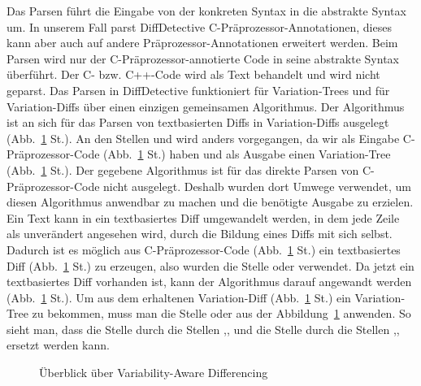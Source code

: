 Das Parsen führt die Eingabe von der konkreten Syntax in die abstrakte Syntax um. In unserem Fall parst DiffDetective  C-Präprozessor-Annotationen, dieses kann aber auch auf andere Präprozessor-Annotationen erweitert werden. Beim Parsen wird nur der C-Präprozessor-annotierte Code in seine abstrakte Syntax überführt. Der C- bzw. C++-Code wird als Text behandelt und wird nicht geparst. Das Parsen in DiffDetective funktioniert für Variation-Trees und für Variation-Diffs über einen einzigen gemeinsamen Algorithmus. Der Algorithmus ist an sich für das Parsen von textbasierten Diffs in Variation-Diffs ausgelegt (Abb.~\ref{fig:1} St.). An den Stellen  und  wird anders vorgegangen, da wir als Eingabe C-Präprozessor-Code (Abb.~\ref{fig:1} St.) haben und als Ausgabe einen Variation-Tree (Abb.~\ref{fig:1} St.). Der gegebene Algorithmus ist für das direkte Parsen von C-Präprozessor-Code nicht ausgelegt. Deshalb wurden dort Umwege verwendet, um diesen Algorithmus anwendbar zu machen und die benötigte Ausgabe zu erzielen.  Ein Text kann in ein textbasiertes Diff umgewandelt werden, in dem jede Zeile als unverändert angesehen wird, durch die Bildung eines Diffs mit sich selbst. Dadurch ist es möglich aus C-Präprozessor-Code (Abb.~\ref{fig:1} St.) ein textbasiertes Diff (Abb.~\ref{fig:1} St.) zu erzeugen, also wurden die Stelle  oder  verwendet. Da jetzt ein textbasiertes Diff vorhanden ist, kann der Algorithmus darauf angewandt werden (Abb.~\ref{fig:1} St.). Um aus dem erhaltenen Variation-Diff (Abb.~\ref{fig:1} St.) ein Variation-Tree zu bekommen, muss man die Stelle  oder  aus der Abbildung~\ref{fig:1} anwenden. So sieht man, dass die Stelle  durch die Stellen ,, und die Stelle  durch die Stellen ,, ersetzt werden kann.



\begin{figure}[H]
	\centering
	\vaShow
	\caption{Überblick über Variability-Aware Differencing~\cite{BSM+:FSE24Companion}}
	\label{fig:1}
\end{figure}


